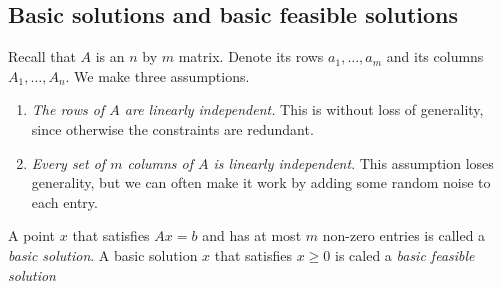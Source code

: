 \documentclass{../../template/note}
\begin{document}
    \subsection{Basic solutions and basic feasible solutions}

    Recall that $A$ is an $n$ by $m$ matrix. Denote its rows $a_1, \dots, a_m$ and its columns $A_1, \dots, A_n$. We make three assumptions.
    \begin{enumerate}[label=\protect\circled{\arabic*}]
        \item \emph{The rows of $A$ are linearly independent.} This is without loss of generality, since otherwise the constraints are redundant.
        \item \emph{Every set of $m$ columns of $A$ is linearly independent}. This assumption loses generality, but we can often make it work by adding some random noise to each entry.
    \end{enumerate}
    
    \begin{definition}
        A point $x$ that satisfies $Ax = b$ and has at most $m$ non-zero entries is called a \emph{basic solution}. A basic solution $x$ that satisfies $x \geq 0$ is caled a \emph{basic feasible solution}
    \end{definition}
    
\end{document}
